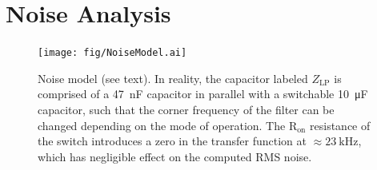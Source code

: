 \documentclass[aip,rsi,reprint]{revtex4-1} %
\begin{document}
\section{Noise Analysis}
\label{Sec:NoiseAnalysis}

\begin{figure}[t]
\texttt{[image: fig/NoiseModel.ai]}
\caption{Noise model (see text). In reality, the capacitor labeled $Z_\text{LP}$ is comprised of a \SI{47}{\nano\farad} capacitor in parallel with a switchable \SI{10}{\micro\farad} capacitor, such that the corner frequency of the filter can be changed depending on the mode of operation. The $\text{R}_\text{on}$ resistance of the switch introduces a zero in the transfer function at $\approx\SI{23}{\kilo\hertz}$, which has negligible effect on the computed RMS noise. \label{Fig:NoiseModel}}
\end{figure}
\end{document}
